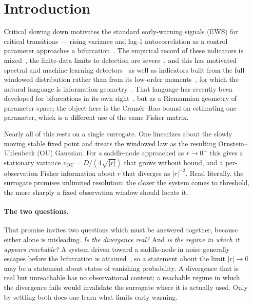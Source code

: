 \documentclass[%
 twocolumn,
 superscriptaddress,
 amsmath,amssymb,
 aps,
 pre,
 floatfix,
]{revtex4-2}
\begin{document}
\maketitle

\section{\label{sec:intro}Introduction}

Critical slowing down motivates the standard early-warning signals (EWS) for critical transitions --- rising variance and lag-1 autocorrelation as a control parameter approaches a bifurcation~\cite{Scheffer2009,Dakos2012,Kuehn2011}.  The empirical record of these indicators is mixed~\cite{Dakos2024,Ditlevsen2023}, the finite-data limits to detection are severe~\cite{Boettiger2012,Grziwotz2023}, and this has motivated spectral and machine-learning detectors~\cite{Bury2020,Bury2021} as well as indicators built from the full windowed distribution rather than from its low-order moments~\cite{Prokopenko2011}, for which the natural language is information geometry~\cite{Amari2000,Nielsen2020}.  That language has recently been developed for bifurcations in its own right~\cite{DaSilva2026}, but as a Riemannian geometry of parameter space; the object here is the Cram\'er--Rao bound on estimating one parameter, which is a different use of the same Fisher matrix.

Nearly all of this rests on a single surrogate.  One linearizes about the slowly moving stable fixed point and treats the windowed law as the resulting Ornstein--Uhlenbeck (OU) Gaussian.  For a saddle-node approached as $r\to0^-$ this gives a stationary variance $v_{\mathrm{OU}}=D/(4\sqrt{|r|})$ that grows without bound, and a per-observation Fisher information about $r$ that diverges as $|r|^{-2}$.  Read literally, the surrogate promises unlimited resolution: the closer the system comes to threshold, the more sharply a fixed observation window should locate it.

\paragraph{The two questions.}
That promise invites two questions which must be answered together, because either alone is misleading.  \emph{Is the divergence real?}  And \emph{is the regime in which it appears reachable?}  A system driven toward a saddle-node in noise generally escapes before the bifurcation is attained~\cite{Ashwin2012,Ritchie2016,BerglundGentz2006}, so a statement about the limit $|r|\to0$ may be a statement about states of vanishing probability.  A divergence that is real but unreachable has no observational content; a reachable regime in which the divergence fails would invalidate the surrogate where it is actually used.  Only by settling both does one learn what limits early warning.
\end{document}
